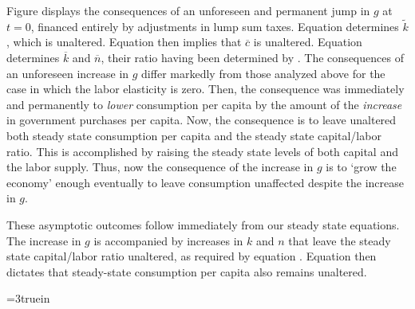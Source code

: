 {}   Figure  displays the consequences
of an unforeseen and permanent  jump in $g$ at $t=0$, financed entirely by adjustments in lump sum taxes.
Equation  determines $\tilde k$, which is unaltered.  Equation  then implies that $\overline c$ is unaltered.
Equation  determines $\overline k$ and $\overline n$, their ratio having been determined by .
  The consequences of an unforeseen  increase in
$g$ differ markedly from those analyzed above for the case in which  the labor elasticity is zero. Then, the consequence was immediately and permanently
to {\it lower\/}
consumption per capita by the amount of the {\it increase\/} in government purchases per capita.  Now,  the consequence 
is to leave unaltered  both  steady state  consumption per capita and the steady state capital/labor ratio.  This is accomplished
 by raising the steady state levels of both capital and the labor supply. Thus, now the consequence of the increase in $g$ is to `grow the economy' enough eventually to leave  consumption unaffected despite the increase in $g$.

 These asymptotic outcomes  follow immediately  from  our steady state equations.  The increase in
$g$ is accompanied by  increases in $k$ and $n$ that leave the steady state capital/labor ratio unaltered, as required by equation .  Equation
 then dictates that  steady-state consumption per capita also remains unaltered.







\centerline{\epsfxsize=3truein}
\caption{Elastic labor supply: response to unforeseen increase  in $g$ at $t=0$.
From left to right, top to bottom: $k, c, n, \bar R, w, g$. The dashed line is the original
steady state.}
\endfigure



%



%

